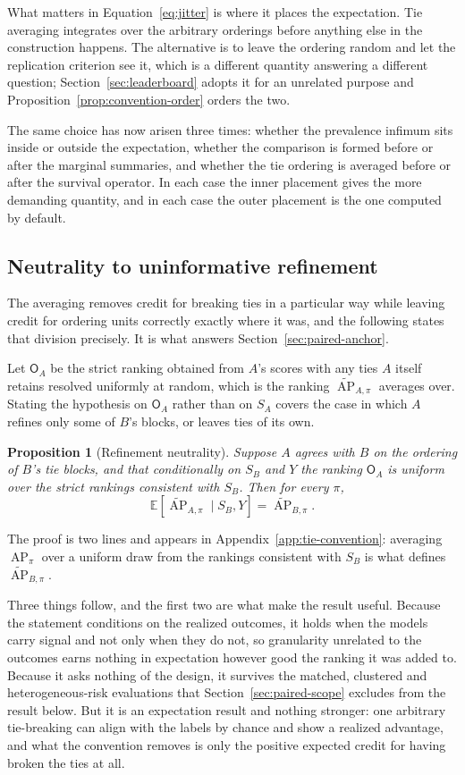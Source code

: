 \documentclass[11pt]{article}
\newcommand{\AP}{\operatorname{AP}}
\newcommand{\E}{\mathbb{E}}
\newcommand{\APta}{\widetilde{\AP}}
\newcommand{\Rank}{\mathsf{O}}
\newtheorem{proposition}{Proposition}
\theoremstyle{remark}
\begin{document}
What matters in Equation~\eqref{eq:jitter} is where it places the expectation. Tie averaging integrates over the arbitrary orderings before anything else in the construction happens. The alternative is to leave the ordering random and let the replication criterion see it, which is a different quantity answering a different question; Section~\ref{sec:leaderboard} adopts it for an unrelated purpose and Proposition~\ref{prop:convention-order} orders the two.

The same choice has now arisen three times: whether the prevalence infimum sits inside or outside the expectation, whether the comparison is formed before or after the marginal summaries, and whether the tie ordering is averaged before or after the survival operator. In each case the inner placement gives the more demanding quantity, and in each case the outer placement is the one computed by default.

\subsection{Neutrality to uninformative refinement}
\label{sec:refinement}

The averaging removes credit for breaking ties in a particular way while leaving credit for ordering units correctly exactly where it was, and the following states that division precisely. It is what answers Section~\ref{sec:paired-anchor}.

Let $\Rank_A$ be the strict ranking obtained from $A$'s scores with any ties $A$ itself retains resolved uniformly at random, which is the ranking $\APta_{A,\pi}$ averages over. Stating the hypothesis on $\Rank_A$ rather than on $S_A$ covers the case in which $A$ refines only some of $B$'s blocks, or leaves ties of its own.

\begin{proposition}[Refinement neutrality]
\label{prop:refinement}
Suppose $A$ agrees with $B$ on the ordering of $B$'s tie blocks, and that conditionally on $S_B$ and $Y$ the ranking $\Rank_A$ is uniform over the strict rankings consistent with $S_B$. Then for every $\pi$,
\[
\E\left[\APta_{A,\pi}\mid S_B,Y\right]
=
\APta_{B,\pi}.
\]
\end{proposition}

The proof is two lines and appears in Appendix~\ref{app:tie-convention}: averaging $\AP_\pi$ over a uniform draw from the rankings consistent with $S_B$ is what defines $\APta_{B,\pi}$.

Three things follow, and the first two are what make the result useful. Because the statement conditions on the realized outcomes, it holds when the models carry signal and not only when they do not, so granularity unrelated to the outcomes earns nothing in expectation however good the ranking it was added to. Because it asks nothing of the design, it survives the matched, clustered and heterogeneous-risk evaluations that Section~\ref{sec:paired-scope} excludes from the result below. But it is an expectation result and nothing stronger: one arbitrary tie-breaking can align with the labels by chance and show a realized advantage, and what the convention removes is only the positive expected credit for having broken the ties at all.
\end{document}

